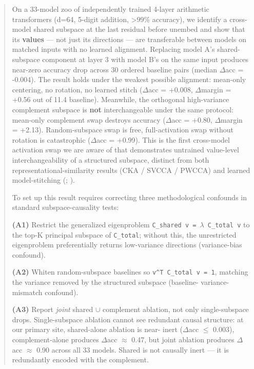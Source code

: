 


\begin{abstract}

On a 33-model zoo of independently trained 4-layer arithmetic
transformers (d=64, 5-digit addition, >99\% accuracy), we identify a
cross-model shared subspace at the last residual before unembed and
show that its \textbf{values} --- not just its directions --- are transferable
between models on matched inputs with no learned alignment. Replacing
model A's shared-subspace component at layer 3 with model B's on the
same input produces near-zero accuracy drop across 30 ordered
baseline pairs (median $\Delta$acc = -0.004). The result holds under the
weakest possible alignment: mean-only centering, no rotation, no
learned stitch ($\Delta$acc = +0.008, $\Delta$margin = +0.56 out of 11.4 baseline).
Meanwhile, the orthogonal high-variance complement subspace is \textbf{not}
interchangeable under the same protocol: mean-only complement swap
destroys accuracy ($\Delta$acc = +0.80, $\Delta$margin = +2.13). Random-subspace
swap is free, full-activation swap without rotation is catastrophic
($\Delta$acc = +0.99). This is the first cross-model activation swap we are
aware of that demonstrates untrained value-level interchangeability of
a structured subspace, distinct from both representational-similarity
results (CKA / SVCCA / PWCCA) and learned model-stitching (\citet{bansal2021stitching}; \citet{lenc2015understanding}).

To set up this result requires correcting three methodological
confounds in standard subspace-causality tests:

\textbf{(A1)} Restrict the generalized eigenproblem \texttt{C\_shared v = $\lambda$ C\_total v}
to the top-K principal subspace of \texttt{C\_total}; without this, the
unrestricted eigenproblem preferentially returns low-variance directions
(variance-bias confound).

\textbf{(A2)} Whiten random-subspace baselines so \texttt{v\textasciicircum{}T C\_total v = 1},
matching the variance removed by the structured subspace (baseline-
variance-mismatch confound).

\textbf{(A3)} Report \emph{joint} shared $\cup$ complement ablation, not only
single-subspace drops. Single-subspace ablation cannot see redundant
causal structure: at our primary site, shared-alone ablation is near-
inert ($\Delta$acc $\leq$ 0.003), complement-alone produces $\Delta$acc $\approx$ 0.47, but joint
ablation produces $\Delta$acc $\approx$ 0.90 across all 33 models. Shared is not
causally inert --- it is redundantly encoded with the complement.


\end{abstract}
